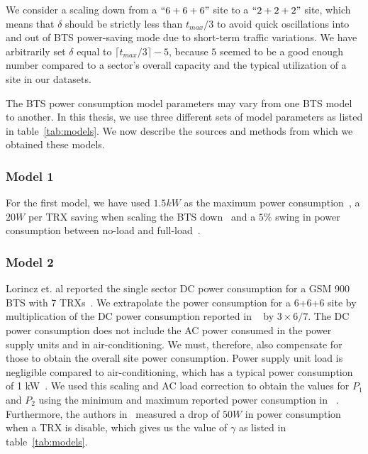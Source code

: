 We consider a scaling down from a $``6+6+6"$ site to a $``2+2+2"$ site, which means that $\delta$ should be strictly less than $t_{max}/3$ to avoid quick oscillations into and out of BTS power-saving mode due to short-term traffic variations. We have arbitrarily set $\delta$ equal to $\lceil t_{max}/3\rceil -5$, because $5$ seemed to be a good enough number compared to a sector's overall capacity and the typical utilization of a site in our datasets.

The BTS power consumption model parameters may vary from one BTS model to another. In this thesis, we use three different sets of model parameters as listed in table~\ref{tab:models}. We now describe the sources and methods from which we obtained these models.
\subsubsection{Model 1}
\label{subsubsec:case2:experiments:sitetypes:model1}For the first model, we have used $1.5kW$ as the maximum power consumption~\cite{mbakwe:btshybribpower:2011:necec}, a $20W$ per TRX saving when scaling the BTS down~\cite{flexibsc} and a $5\%$ swing in power consumption between no-load and full-load~\cite{Peng:2011:BTSSaving:Mobicom}.

\subsubsection{Model 2}
\label{subsubsec:case2:experiments:sitetypes:model2} Lorincz et. al reported the single sector DC power consumption for a GSM 900 BTS with 7 TRXs~\cite{Lorincz:BTS-Measure:Sensors:2012}. We extrapolate the power consumption for a 6+6+6 site by multiplication of the DC power consumption reported in ~\cite{Lorincz:BTS-Measure:Sensors:2012} by $3\times6/7$. The DC power consumption does not include the AC power consumed in the power supply units and in air-conditioning. We must, therefore, also compensate for those to obtain the overall site power consumption. Power supply unit load is negligible compared to air-conditioning, which has a typical power consumption of 1 kW~\cite{mbakwe:btshybribpower:2011:necec}. We used this scaling and AC load correction to obtain the values for $P_1$ and $P_2$ using the minimum and maximum reported power consumption in ~\cite{Lorincz:BTS-Measure:Sensors:2012}. Furthermore, the authors in~\cite{Lorincz:BTS-Measure:Sensors:2012} measured a drop of $50W$ in power consumption when a TRX is disable, which gives us the value of $\gamma$ as listed in table~\ref{tab:models}.

